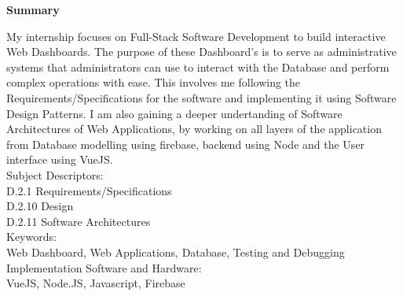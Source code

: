 \begin{center}
	\Large\textbf{Summary}
\end{center}
\noindent
My internship focuses on Full-Stack Software Development to build interactive Web Dashboards.
The purpose of these Dashboard's is to serve as administrative systems that administrators can use to interact
with the Database and perform complex operations with ease.
This involves me following the Requirements/Specifications for the software and implementing it using Software Design Patterns.
I am also gaining a deeper undertanding of Software Architectures of Web Applications, by working on all layers of the application from
Database modelling using firebase, backend using Node and the User interface using VueJS.
\\

\noindent
Subject Descriptors:\\
\indent D.2.1  Requirements/Specifications\\
\indent D.2.10 Design\\
\indent D.2.11 Software Architectures\\

\noindent
Keywords:\\
\indent Web Dashboard, Web Applications, Database, Testing and Debugging\\

\noindent
Implementation Software and Hardware:\\
\indent VueJS, Node.JS, Javascript, Firebase